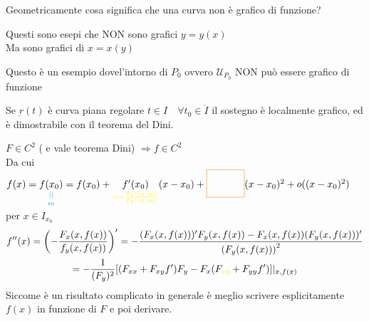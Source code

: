 \documentclass[a4paper, oneside]{article}
\begin{document}
\begin{observation}
    Geometricamente cosa significa che una curva non è grafico di funzione?
    \begin{center}
    \end{center}
    Questi sono esepi che NON sono grafici $y=y(x)$\\
    Ma sono grafici di $x=x(y)$
    \begin{center}
    \end{center}
    Questo è un esempio dovel'intorno di $P_0$ ovvero $\mathcal{U}_{P_0}$ NON può essere grafico di funzione
\end{observation}

\begin{observation}
    Se $\underbar{r}(t)$ è curva piana regolare $t \in I \quad \forall t_0 \in \mathring{I}$ il sostegno è localmente grafico, ed è dimostrabile con il teorema del Dini.
\end{observation}

\begin{observation}
    $F \in C^2$ ( e vale teorema Dini) $\Rightarrow f \in C^2$\\
    Da cui $f(x) = \underset{\textcolor{cyan}{\underset{y_0}{||}}}{f(x_0)} = f(x_0) + \underset{\textcolor{yellow}{= -\frac{F_x(x_0,y_0)}{F_y(x_0,y_0)}}}{f'(x_0)}(x-x_0) + \textcolor{orange}{\boxed{\textcolor{white}{\frac{f''(x_0)}{2}}}}(x-x_0)^2 + o((x-x_0)^2)$
    per $x \in I_{x_0}$
    \begin{gather*}
        f''(x) = \left(-\frac{F_x(x,f(x))}{f_y(x,f(x))}\right)' = -\frac{(F_x(x,f(x)))'F_y(x,f(x))-F_x(x,f(x))(F_y(x,f(x)))'}{\left(F_y(x,f(x))\right)^2 }\\
        = -\frac{1}{(F_y)^2}[(F_{xx} + F_{xy}f')F_y-F_x(F_{\textcolor{yellow}{xy}}+F_{yy}f')]\vert_{x,f(x)} 
    \end{gather*}
    Siccome è un risultato complicato in generale è meglio scrivere esplicitamente $f(x)$ in funzione di $F$ e poi derivare.
\end{observation}
\end{document}
